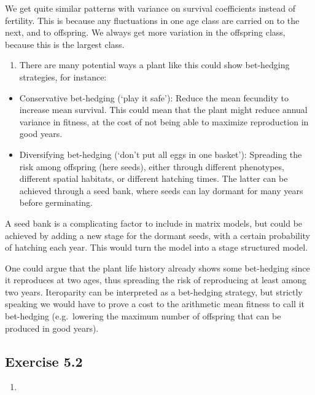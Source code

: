 \documentclass[
]{book}
\providecommand{\tightlist}{%
  \setlength{\itemsep}{0pt}\setlength{\parskip}{0pt}}
\begin{document}
We get quite similar patterns with variance on survival coefficients instead of fertility. This is because any fluctuations in one age class are carried on to the next, and to offspring. We always get more variation in the offspring class, because this is the largest class.

\begin{enumerate}
\def\labelenumi{\arabic{enumi}.}
\setcounter{enumi}{2}
\tightlist
\item
  There are many potential ways a plant like this could show bet-hedging strategies, for instance:
\end{enumerate}

\begin{itemize}
\item
  Conservative bet-hedging (`play it safe'): Reduce the mean fecundity to increase mean survival. This could mean that the plant might reduce annual variance in fitness, at the cost of not being able to maximize reproduction in good years.
\item
  Diversifying bet-hedging (`don't put all eggs in one basket'): Spreading the risk among offspring (here seeds), either through different phenotypes, different spatial habitats, or different hatching times. The latter can be achieved through a seed bank, where seeds can lay dormant for many years before germinating.
\end{itemize}

A seed bank is a complicating factor to include in matrix models, but could be achieved by adding a new stage for the dormant seeds, with a certain probability of hatching each year. This would turn the model into a stage structured model.

One could argue that the plant life history already shows some bet-hedging since it reproduces at two ages, thus spreading the risk of reproducing at least among two years. Iteroparity can be interpreted as a bet-hedging strategy, but strictly speaking we would have to prove a cost to the arithmetic mean fitness to call it bet-hedging (e.g.~lowering the maximum number of offspring that can be produced in good years).

\hypertarget{exercise-5.2-1}{%
\subsection*{Exercise 5.2}\label{exercise-5.2-1}}

\begin{enumerate}
\def\labelenumi{\arabic{enumi}.}
\tightlist
\item
\end{enumerate}
\end{document}
